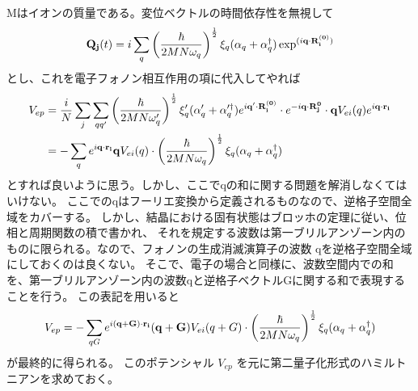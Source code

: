 \documentclass[letterpaper,10pt,dvipdfmx]{sphinxhowto}
\begin{document}
Mはイオンの質量である。変位ベクトルの時間依存性を無視して
\begin{equation*}
\begin{split}\begin{aligned}
{\bf Q_j}(t)=i\sum_q \left(\frac{\hbar}{2MN\omega_q} \right)^\frac{1}{2} \xi_q
(\alpha_q +\alpha_q^\dagger )
\exp^{(i{\bf q\cdot R_i^{(0)}})}\end{aligned}\end{split}
\end{equation*}
とし、これを電子フォノン相互作用の項に代入してやれば
\begin{equation*}
\begin{split}\begin{aligned}
V_{ep}&=\frac{i}{N} \sum_j \sum_{qq'}
\left(\frac{\hbar}{2MN\omega_q'}\right)^\frac{1}{2} \xi_q' (\alpha_q' +\alpha_q'^\dagger ) e^{i{\bf q'\cdot R_i^{(0)}}} \cdot e^{-i{\bf q} \cdot {\bf
R_j^{0}}} \cdot  {\bf q}V_{ei}(q)
e^{i {\bf q} \cdot{\bf r_i}}  \\
&=-\sum_{q}e^{i {\bf q} \cdot{\bf r_i}} {\bf q}V_{ei}(q) \cdot
\left(\frac{\hbar}{2MN\omega_q} \right)^\frac{1}{2} \xi_q (\alpha_q +\alpha_q^\dagger )\end{aligned}\end{split}
\end{equation*}
とすれば良いように思う。しかし、ここでqの和に関する問題を解消しなくてはいけない。
ここでのqはフーリエ変換から定義されるものなので、逆格子空間全域をカバーする。
しかし、結晶における固有状態はブロッホの定理に従い、位相と周期関数の積で書かれ、
それを規定する波数は第一ブリルアンゾーン内のものに限られる。なので、フォノンの生成消滅演算子の波数
qを逆格子空間全域にしておくのは良くない。
そこで、電子の場合と同様に、波数空間内での和を、第一ブリルアンゾーン内の波数qと逆格子ベクトルGに関する和で表現することを行う。
この表記を用いると
\begin{equation*}
\begin{split}\begin{aligned}
V_{ep}=-\sum_{qG}e^{i {\bf (q+G)} \cdot{\bf r_i}} {\bf (q+G)}V_{ei}(q+G) \cdot
\left(\frac{\hbar}{2MN\omega_q} \right)^\frac{1}{2} \xi_q (\alpha_q +\alpha_q^\dagger )
\end{aligned}\end{split}
\end{equation*}
が最終的に得られる。 このポテンシャル \(V_{ep}\) を元に第二量子化形式のハミルトニアンを求めておく。
\end{document}
